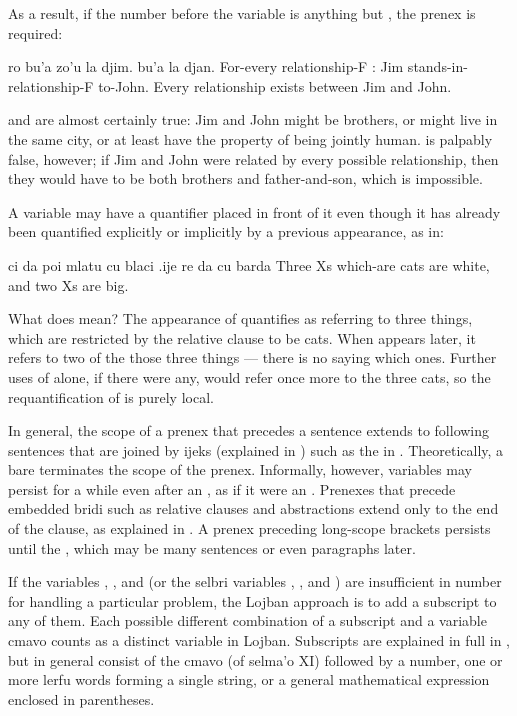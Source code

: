 As a result, if the number before the variable is anything but
    , the prenex is required:
\begin{example}
ro bu'a zo'u\n
\T	la djim. bu'a la djan.\n
For-every relationship-F :\n
\T	Jim stands-in-relationship-F to-John.\n
Every relationship exists between Jim and John.
\end{example}

 and  are almost certainly true: Jim and John might be
    brothers, or might live in the same city, or at least have the
    property of being jointly human.  is palpably false, however; if Jim and John were
    related by every possible relationship, then they would have to
    be both brothers and father-and-son, which is impossible.



A variable may have a quantifier placed in front of it even
    though it has already been quantified explicitly or implicitly
    by a previous appearance, as in:
\begin{example}
ci da poi mlatu cu blaci .ije re da cu barda\n
Three Xs which-are cats are white, and two Xs are big.
\end{example}

What does  mean? The
    appearance of  quantifies  as referring to three
    things, which are restricted by the relative clause to be cats.
    When  appears later, it refers to two of the those
    three things --- there is no saying which ones. Further uses of
     alone, if there were any, would refer once more to the
    three cats, so the requantification of  is purely
    local.

In general, the scope of a prenex that precedes a sentence
    extends to following sentences that are joined by ijeks
    (explained in ) such as the
     in . Theoretically, a
    bare  terminates the scope of the prenex. Informally,
    however, variables may persist for a while even after an
    , as if it were an . Prenexes that precede
    embedded bridi such as relative clauses and abstractions extend
    only to the end of the clause, as explained in . A prenex preceding 
    long-scope brackets persists until the , which may be
    many sentences or even paragraphs later.

If the variables , , and  (or the selbri
    variables , , and ) are insufficient in
    number for handling a particular problem, the Lojban approach
    is to add a subscript to any of them. Each possible different
    combination of a subscript and a variable cmavo counts as a
    distinct variable in Lojban. Subscripts are explained in full
    in , but in general consist
    of the cmavo  (of selma'o XI) followed by a number, one
    or more lerfu words forming a single string, or a general
    mathematical expression enclosed in parentheses.

